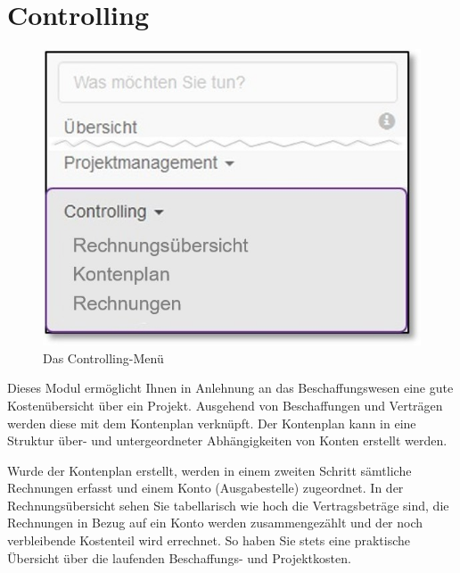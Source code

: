 
\clearpage
\section{Controlling}

\begin{figure}   %
  \vspace{-35pt}      %
  \begin{center}
    \includegraphics[width=1\linewidth]{../chapters/07_Controlling/pictures/contr_Uebersicht.jpg}
  \end{center}
  \vspace{-20pt}
  \caption{Das Controlling-Menü}
  \vspace{-10pt}
\end{figure}

Dieses Modul ermöglicht Ihnen in Anlehnung an das Beschaffungswesen eine gute Kostenübersicht über ein Projekt.
Ausgehend von Beschaffungen und Verträgen werden diese mit dem Kontenplan verknüpft. Der Kontenplan kann in eine Struktur über- und untergeordneter Abhängigkeiten von Konten erstellt werden.

\vspace{2cm} 

Wurde der Kontenplan erstellt, werden in einem zweiten Schritt sämtliche Rechnungen erfasst und einem Konto (Ausgabestelle) zugeordnet. In der Rechnungsübersicht sehen Sie tabellarisch wie hoch die Vertragsbeträge sind, die Rechnungen in Bezug auf ein Konto werden zusammengezählt und der noch verbleibende Kostenteil wird errechnet. So haben Sie stets eine praktische Übersicht über die laufenden Beschaffungs- und Projektkosten.



